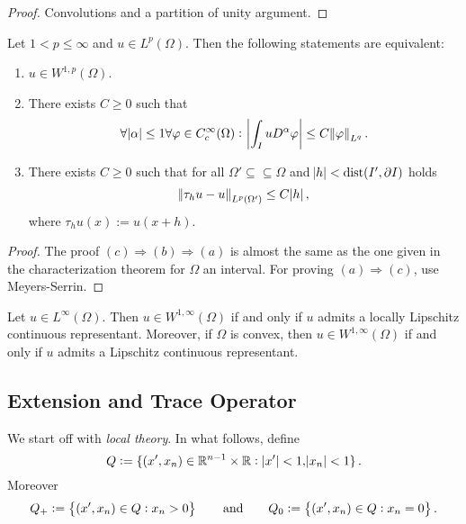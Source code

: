 \begin{proof}
	Convolutions and a partition of unity argument.
\end{proof}

\begin{theorem}
	Let $1 < p \leq \infty$ and $u \in L^p(\Omega)$. Then the following statements are equivalent:
	\begin{enumerate}[label = \textup{(}\alph*\textup{)},wide = 0pt]
		\item $u \in W^{1,p}(\Omega)$.
		\item There exists $C \geq 0$ such that
			\begin{equation*}
				\forall \abs{\alpha} \leq 1\forall \varphi \in C^\infty_c(\Omega): \> \abs[3]{\int_I uD^\alpha \varphi} \leq C\norm{\varphi}_{L^q}.
			\end{equation*}
		\item There exists $C \geq 0$ such that for all $\Omega' \subseteq \subseteq \Omega$ and $\abs{h} < \operatorname{dist}(I',\partial I)$ holds
			\begin{equation*}
				\norm{\tau_hu - u}_{L^p(\Omega')} \leq C\abs{h},
			\end{equation*}
			\noindent where $\tau_hu(x) := u(x + h)$.
	\end{enumerate}
\end{theorem}

\begin{proof}
	The proof $(c)\Rightarrow(b)\Rightarrow(a)$ is almost the same as the one given in the characterization theorem for $\Omega$ an interval. For proving $(a)\Rightarrow(c)$, use Meyers-Serrin.
\end{proof}

\begin{corollary}
	Let $u \in L^\infty(\Omega)$. Then $u \in W^{1,\infty}(\Omega)$ if and only if $u$ admits a locally Lipschitz continuous representant. Moreover, if $\Omega$ is convex, then $u \in W^{1,\infty}(\Omega)$ if and only if $u$ admits a Lipschitz continuous representant. 
\end{corollary}

\subsection*{Extension and Trace Operator}

We start off with \emph{local theory}. In what follows, define
\begin{equation*}
	Q := \cbr[0]{(x',x_n) \in \mathbb{R}^{n - 1} \times \mathbb{R} : \abs[0]{x'} < 1, \abs{x_n} < 1}.
\end{equation*}
\noindent Moreover
\begin{equation*}
	Q_+ := \cbr{(x',x_n) \in Q : x_n > 0} \qquad \text{and} \qquad Q_0 := \cbr{(x',x_n) \in Q : x_n = 0}.
\end{equation*}

